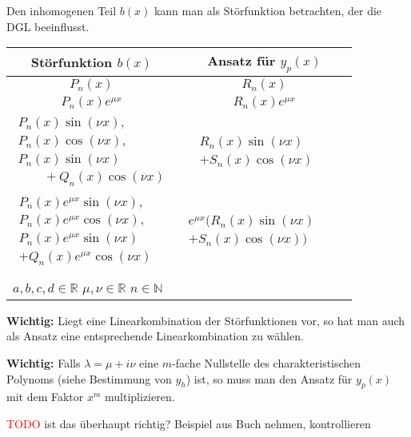 \documentclass[a4paper,landscape,8pt]{extarticle}
\newcommand{\N}{\mathbb{N}}
\newcommand{\R}{\mathbb{R}}
\newcommand{\todo}{\textcolor{red}{TODO }}
\newcommand{\Wichtig}{\textbf{Wichtig: }}
\begin{document}
\begin{multicols*}{4}
\begin{warmup}
Den inhomogenen Teil $b(x)$ kann man als Störfunktion betrachten, der die
DGL beeinflusst.
\end{warmup}

\begin{table}[H]
\centering
\begin{tabular}{cc}
\toprule
\textbf{Störfunktion} $b(x)$ & \textbf{Ansatz für} $y_p(x)$\\
\midrule
$P_n(x)$ & $R_n(x)$
\\
\hline
$P_n(x)e^{\mu x}$ & $R_n(x)e^{\mu x}$
\\
\hline
$\begin{matrix}
P_n(x)\sin(\nu x),\\
P_n(x)\cos(\nu x),\\
P_n(x)\sin(\nu x)\qquad\\
\qquad + Q_n(x)\cos(\nu x)
\end{matrix}$
& 
$\begin{matrix}R_n(x)\sin(\nu x)\qquad\\ + S_n(x)\cos(\nu x)\end{matrix}$
\\
\hline
$\begin{matrix}
P_n(x)e^{\mu x}\sin(\nu x),\\
P_n(x)e^{\mu x}\cos(\nu x),\\
P_n(x)e^{\mu x}\sin(\nu x)\qquad\\
+ Q_n(x)e^{\mu x}\cos(\nu x)
\end{matrix}$
&
$\begin{matrix}e^{\mu x}(R_n(x)\sin(\nu x)\qquad\\ + S_n(x)\cos(\nu
x))\end{matrix}$\\
\bottomrule
\\
\multicolumn{2}{l}{$a,b,c,d\in \R$ \quad $\mu,\nu\in\R$ \quad $n\in \N$}
\end{tabular}
\end{table}

\Wichtig Liegt eine Linearkombination der Störfunktionen vor, so hat man auch
als Ansatz eine entsprechende Linearkombination zu wählen.

\Wichtig Falls $\lambda=\mu + i\nu$ eine $m$-fache Nullstelle des
charakteristischen Polynoms (siehe Bestimmung von $y_h$) ist, so muss man
 den Ansatz für $y_p(x)$ mit dem Faktor $x^m$ multiplizieren.

\begin{warmup}
\todo ist das überhaupt richtig? Beispiel aus Buch nehmen, kontrollieren
\end{warmup}


\end{multicols*}
\end{document}
